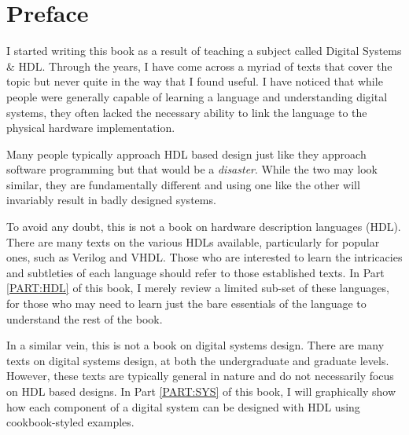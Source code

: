 
\chapter*{Preface}

I started writing this book as a result of teaching a subject called Digital Systems \& HDL.
Through the years, I have come across a myriad of texts that cover the topic but never quite in the way that I found useful.
I have noticed that while people were generally capable of learning a language and understanding digital systems, they often lacked the necessary ability to link the language to the physical hardware implementation.


Many people typically approach HDL based design just like they approach software programming but that would be a \emph{disaster}.
While the two may look similar, they are fundamentally different and using one like the other will invariably result in badly designed systems.

To avoid any doubt, this is not a book on hardware description languages (HDL).
There are many texts on the various HDLs available, particularly for popular ones, such as Verilog and VHDL.
Those who are interested to learn the intricacies and subtleties of each language should refer to those established texts.
In Part \ref{PART:HDL} of this book, I merely review a limited sub-set of these languages, for those who may need to learn just the bare essentials of the language to understand the rest of the book.

In a similar vein, this is not a book on digital systems design.
There are many texts on digital systems design, at both the undergraduate and graduate levels.
However, these texts are typically general in nature and do not necessarily focus on HDL based designs.
In Part \ref{PART:SYS} of this book, I will graphically show how each component of a digital system can be designed with HDL using cookbook-styled examples.

